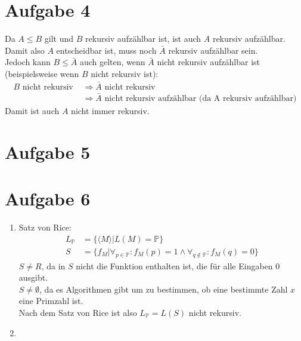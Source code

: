 \documentclass[a4paper,11pt]{scrartcl}
\begin{document}
	\section*{Aufgabe 4}
	Da $A \leq B$ gilt und $B$ rekursiv aufzählbar ist, ist auch $A$ rekursiv aufzählbar.\\
	Damit also $A$ entscheidbar ist, muss noch $\bar{A}$ rekursiv aufzählbar sein.\\
	Jedoch kann $B \leq \bar{A}$ auch gelten, wenn $\bar{A}$ nicht rekursiv aufzählbar ist (beispielsweise wenn $B$ nicht rekursiv ist):
	\begin{align*}
	B \text{ nicht rekursiv } 	&\Rightarrow \bar{A} \text{ nicht rekursiv} \\
								&\Rightarrow \bar{A} \text{ nicht rekursiv aufzählbar (da A rekursiv aufzählbar)}
	\end{align*}
	Damit ist auch $A$ nicht immer rekursiv.
	
		
	\section*{Aufgabe 5}
	
	
	\section*{Aufgabe 6}
	\begin{enumerate}[label=\alph*)]
	\item	Satz von Rice:
			\begin{align*}
			L_{\mathbb{P}} &= \{\langle M \rangle \vert L(M) = \mathbb{P}\} \\
			S &= \{f_M \vert \forall_{p\in\mathbb{P}}: f_M(p) = 1 \land \forall_{q\not\in\mathbb{P}}: f_M(q) = 0\}		
			\end{align*}
			$S \neq R$, da in $S$ nicht die Funktion enthalten ist, die für alle Eingaben $0$ ausgibt.\\
			$S \neq \emptyset$, da es Algorithmen gibt um zu bestimmen, ob eine bestimmte Zahl $x$ eine Primzahl ist.\\
			Nach dem Satz von Rice ist also $L_{\mathbb{P}} = L(S)$ nicht rekursiv.
	\item	
	\end{enumerate}
	
\newpage
	
\end{document}
